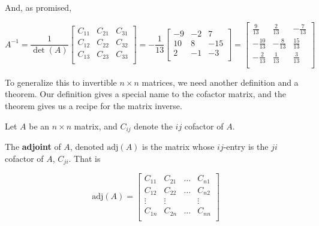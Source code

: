 \documentclass{ximera}
\begin{document}
And, as promised,

\[ A^{-1} = \frac{1}{\det(A)} \left[ \begin{array}{ccc} C_{11} & C_{21} & C_{31} \\ C_{12} & C_{22} & C_{32} \\ C_{13} & C_{23} & C_{33} \\ \end{array} \right] = -\frac{1}{13} \left[ \begin{array}{rrr} -9 & -2 & 7\\ 10 & 8 & -15 \\ 2  &  -1 &  -3 \\ \end{array} \right]  =  \left[ \begin{array}{rrr} \frac{9}{13} & \frac{2}{13} & -\frac{7}{13} \\  -\frac{10}{13} & -\frac{8}{13} & \frac{15}{13} \\  -\frac{2}{13} & \frac{1}{13} & \frac{3}{13} \\ \end{array} \right] \]

To generalize this to invertible $n \times n$ matrices, we need another definition and a theorem.  Our definition gives a special name to the cofactor matrix, and the theorem gives us a recipe for the matrix inverse.

 


\begin{definition}  \label{matrixadjoint} Let $A$ be an $n \times n$ matrix, and $C_{ij}$ denote the $ij$ cofactor of $A$.  

The \textbf{adjoint} of $A$, denoted $\text{adj}(A)$ is the matrix whose $ij$-entry is the $ji$ cofactor of $A$, $C_{ji}$.  That is

\[ \text{adj}(A) = \left[
\begin{array}{cccc} 
C_{11} & C_{21} & \ldots & C_{n1} \\  
C_{12} & C_{22} & \ldots & C_{n2} \\
   \vdots  & \vdots & & \vdots \\
C_{1n} & C_{2n} & \ldots & C_{nn} \\  \end{array} \right] \]


\end{definition}

\end{document}
